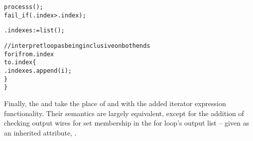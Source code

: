 \begin{alltt}
    processs();
    fail_if(.index > .index);

    .indexes := list();

    // interpret loop as being inclusive on both ends
    for i from .index
        to .index \{
      .indexes.append(i);
    \}
  \}
\end{alltt}

Finally, the  and  take the place of  and  with the added iterator expression functionality.
Their semantics are largely equivalent, except for the addition of checking output wires for set membership in the for loop's output list -- given as an inherited attribute, .\\

